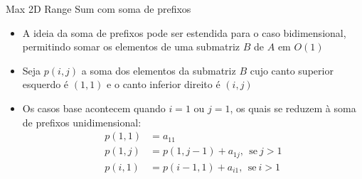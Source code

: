 \begin{frame}[fragile]{Max 2D Range Sum com soma de prefixos}

    \begin{itemize}
        \item A ideia da soma de prefixos pode ser estendida para o caso bidimensional, permitindo
            somar os elementos de uma submatriz $B$ de $A$ em $O(1)$

        \item Seja $p(i, j)$ a soma dos elementos da submatriz $B$ cujo canto superior esquerdo
            é $(1, 1)$ e o canto inferior direito é $(i, j)$

        \item Os casos base acontecem quando $i = 1$ ou $j = 1$, os quais se reduzem à soma de
            prefixos unidimensional:
        \begin{align*}
            p(1, 1) &= a_{11} \\
            p(1, j) &= p(1, j - 1) + a_{1j},\ \ \mbox{se}\ j > 1 \\
            p(i, 1) &= p(i - 1, 1) + a_{i1},\ \ \mbox{se}\ i > 1
        \end{align*}
    \end{itemize}

\end{frame}

